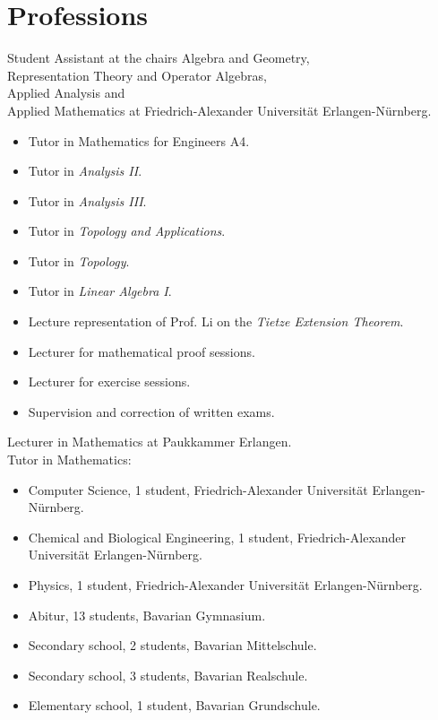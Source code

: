 \documentclass[a4paper, 11pt]{article}
\newcommand{\years}[1]{\marginnote{\scriptsize #1}}
\begin{document}
	\section*{Professions}
	\years{2023--25} Student Assistant at the chairs Algebra and Geometry, \\ Representation
	Theory and Operator Algebras, \\ Applied Analysis and \\ Applied Mathematics at
	Friedrich-Alexander Universität Erlangen-Nürnberg.
	\begin{itemize}
		\item Tutor in \glqq Mathematics for Engineers A4\grqq.

		\item Tutor in \emph{Analysis II}.

		\item Tutor in \emph{Analysis III}.

		\item Tutor in \emph{Topology and Applications}.

		\item Tutor in \emph{Topology}.

		\item Tutor in \emph{Linear Algebra I}.

		\item Lecture representation of Prof. Li on the \emph{Tietze Extension Theorem}.

		\item Lecturer for mathematical proof sessions.

		\item Lecturer for exercise sessions.

		\item Supervision and correction of written exams.
	\end{itemize}
	\years{2025} Lecturer in Mathematics at Paukkammer Erlangen.\\
	\years{2024--25} Tutor in Mathematics:
	\begin{itemize}
		\item Computer Science, 1 student, Friedrich-Alexander Universität Erlangen-Nürnberg.

		\item Chemical and Biological Engineering, 1 student, Friedrich-Alexander Universität Erlangen-Nürnberg.

		\item Physics, 1 student, Friedrich-Alexander Universität Erlangen-Nürnberg.

		\item Abitur, 13 students, Bavarian Gymnasium.

		\item Secondary school, 2 students, Bavarian Mittelschule.

		\item Secondary school, 3 students, Bavarian Realschule.

		\item Elementary school, 1 student, Bavarian Grundschule.
	\end{itemize}
\end{document}
